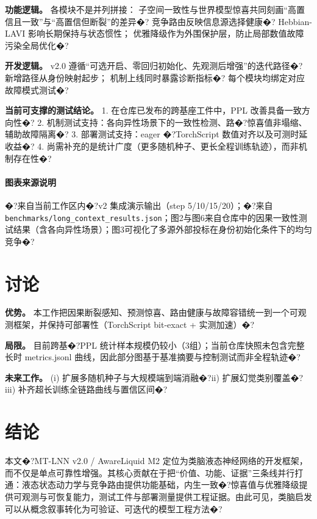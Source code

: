 \documentclass[10pt,twocolumn]{ctexart}
\begin{document}
\textbf{功能逻辑。} 各模块不是并列拼接：
子空间一致性与世界模型惊喜共同刻画“高置信且一致”与“高置信但断裂”的差异�?
竞争路由反映信息源选择健康�?
Hebbian-LAVI 影响长期保持与状态惯性；
优雅降级作为外围保护层，防止局部数值故障污染全局优化�?

\textbf{开发逻辑。} v2.0 遵循“可选开启、零回归初始化、先观测后增强”的迭代路径�?
新增路径从身份映射起步；
机制上线同时暴露诊断指标�?
每个模块均绑定对应故障模式测试�?

\textbf{当前可支撑的测试结论。}
1. 在仓库已发布的跨基座工件中，PPL 改善具备一致方向性�?
2. 机制测试支持：各向异性场景下的一致性检测、路�?惊喜值非塌缩、辅助故障隔离�?
3. 部署测试支持：eager �?TorchScript 数值对齐以及可测时延收益�?
4. 尚需补充的是统计广度（更多随机种子、更长全程训练轨迹），而非机制存在性�?

\paragraph{图表来源说明}
�?来自当前工作区内�?v2 集成演示输出（step 5/10/15/20）；�?来自 \texttt{benchmarks/long\_context\_results.json}；图2与图6来自仓库中的因果一致性测试结果（含各向异性场景）；图3可视化了多源外部投标在身份初始化条件下的均匀竞争�?

\FloatBarrier

\section{讨论}
\textbf{优势。} 本工作把因果断裂感知、预测惊喜、路由健康与故障容错统一到一个可观测框架，并保持可部署性（TorchScript bit-exact + 实测加速）�?

\textbf{局限。} 目前跨基�?PPL 统计样本规模仍较小（3组）；当前仓库快照未包含完整长时 metrics.jsonl 曲线，因此部分图基于基准摘要与控制测试而非全程轨迹�?

\textbf{未来工作。} (i) 扩展多随机种子与大规模端到端消融�?ii) 扩展幻觉类别覆盖�?iii) 补齐超长训练全链路曲线与置信区间�?

\section{结论}
本文�?MT-LNN v2.0 / AwareLiquid M2 定位为类脑液态神经网络的开发框架，而不仅是单点可靠性增强。其核心贡献在于把“价值、功能、证据”三条线并行打通：液态状态动力学与竞争路由提供功能基础，内生一致�?惊喜值与优雅降级提供可观测与可恢复能力，测试工件与部署测量提供工程证据。由此可见，类脑启发可以从概念叙事转化为可验证、可迭代的模型工程方法�?

\FloatBarrier
\clearpage
\balance
\end{document}
